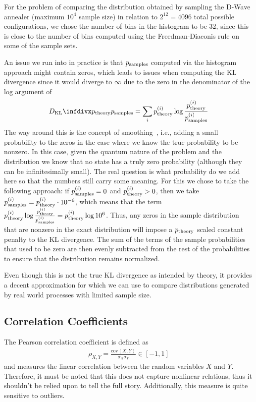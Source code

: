 For the problem of comparing the distribution obtained by sampling the D-Wave annealer (maximum \( 10^4 \) sample size) in relation to \( 2^{12} = 4096 \) total possible configurations, we chose the number of bins in the histogram to be 32, since this is close to the number of bins computed using the Freedman-Diaconis rule on some of the sample sets.

An issue we run into in practice is that \( p_{\text{samples}} \) computed via the histogram approach might contain zeros, which leads to issues when computing the KL divergence since it would diverge to \( \infty \) due to the zero in the denominator of the log argument of
\begin{align}
    \DKL{\ptheory}{\psamples} = \sum_i \ptheory^{(i)} \log\frac{\ptheory^{(i)}}{\psamples^{(i)}}
\end{align}
The way around this is the concept of smoothing~\cite{han_kl_divergence}, i.e., adding a small probability to the zeros in the case where we know the true probability to be nonzero.
In this case, given the quantum nature of the problem and the distribution we know that no state has a truly zero probability (although they can be infinitesimally small).
The real question is what probability do we add here so that the numbers still carry some meaning.
For this we chose to take the following approach: if \( p_{\text{samples}}^{(i)} = 0 \) and \( p_{\text{theory}}^{(i)} > 0 \), then we take \( p_{\text{samples}}^{(i)} = p_{\text{theory}}^{(i)} \cdot 10^{-6} \), which means that the term \( p_{\text{theory}}^{(i)} \log \frac{p_{\text{theory}}^{(i)}}{p_{\text{samples}}^{(i)}} = p_{\text{theory}}^{(i)} \log 10^6 \).
Thus, any zeros in the sample distribution that are nonzero in the exact distribution will impose a \( p_{\text{theory}} \) scaled constant penalty to the KL divergence.
The sum of the terms of the sample probabilities that used to be zero are then evenly subtracted from the rest of the probabilities to ensure that the distribution remains normalized.

Even though this is not the true KL divergence as intended by theory, it provides a decent approximation for which we can use to compare distributions generated by real world processes with limited sample size.


\subsection{Correlation Coefficients}\label{app:correlation_coefficients}
The Pearson correlation coefficient is defined as
\begin{align}
    \rho_{X,Y} = \frac{\text{cov}{(X,Y)}}{\sigma_X \sigma_Y} \in [-1, 1]
\end{align}
and measures the linear correlation between the random variables \( X \) and \( Y \).
Therefore, it must be noted that this does not capture nonlinear relations, thus it shouldn't be relied upon to tell the full story.
Additionally, this measure is quite sensitive to outliers.

